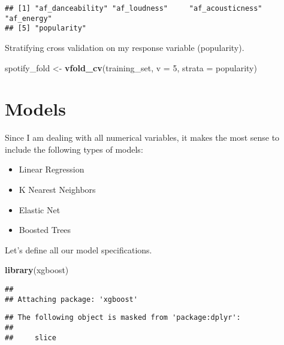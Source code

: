 \documentclass[
]{article}
\newenvironment{Shaded}{\begin{snugshade}}{\end{snugshade}}
\newcommand{\AttributeTok}[1]{\textcolor[rgb]{0.13,0.29,0.53}{#1}}
\newcommand{\DecValTok}[1]{\textcolor[rgb]{0.00,0.00,0.81}{#1}}
\newcommand{\FunctionTok}[1]{\textcolor[rgb]{0.13,0.29,0.53}{\textbf{#1}}}
\newcommand{\NormalTok}[1]{#1}
\newcommand{\OtherTok}[1]{\textcolor[rgb]{0.56,0.35,0.01}{#1}}
\begin{document}
\begin{verbatim}
## [1] "af_danceability" "af_loudness"     "af_acousticness" "af_energy"      
## [5] "popularity"
\end{verbatim}

Stratifying cross validation on my response variable (popularity).

\begin{Shaded}
\begin{Highlighting}[]
\NormalTok{spotify\_fold }\OtherTok{\textless{}{-}} \FunctionTok{vfold\_cv}\NormalTok{(training\_set, }\AttributeTok{v =} \DecValTok{5}\NormalTok{, }\AttributeTok{strata =}\NormalTok{ popularity)}
\end{Highlighting}
\end{Shaded}

\hypertarget{models}{%
\section{\texorpdfstring{\textbf{Models}}{Models}}\label{models}}

Since I am dealing with all numerical variables, it makes the most sense
to include the following types of models:

\begin{itemize}
\item
  Linear Regression
\item
  K Nearest Neighbors
\item
  Elastic Net
\item
  Boosted Trees
\end{itemize}

Let's define all our model specifications.

\begin{Shaded}
\begin{Highlighting}[]
\FunctionTok{library}\NormalTok{(xgboost)}
\end{Highlighting}
\end{Shaded}

\begin{verbatim}
## 
## Attaching package: 'xgboost'
\end{verbatim}

\begin{verbatim}
## The following object is masked from 'package:dplyr':
## 
##     slice
\end{verbatim}
\end{document}

